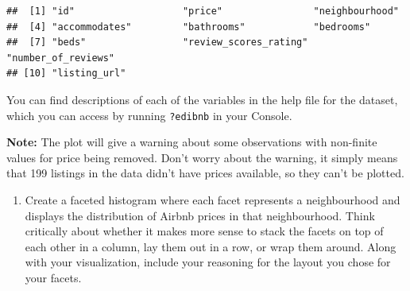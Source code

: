 \documentclass[
]{article}
\providecommand{\tightlist}{%
  \setlength{\itemsep}{0pt}\setlength{\parskip}{0pt}}
\begin{document}
\begin{verbatim}
##  [1] "id"                   "price"                "neighbourhood"       
##  [4] "accommodates"         "bathrooms"            "bedrooms"            
##  [7] "beds"                 "review_scores_rating" "number_of_reviews"   
## [10] "listing_url"
\end{verbatim}

You can find descriptions of each of the variables in the help file for
the dataset, which you can access by running \texttt{?edibnb} in your
Console.

\begin{marginnote}
\textbf{Note:} The plot will give a warning about some observations with
non-finite values for price being removed. Don't worry about the
warning, it simply means that 199 listings in the data didn't have
prices available, so they can't be plotted.
\end{marginnote}

\begin{enumerate}
\def\labelenumi{\arabic{enumi}.}
\tightlist
\item
  Create a faceted histogram where each facet represents a neighbourhood
  and displays the distribution of Airbnb prices in that neighbourhood.
  Think critically about whether it makes more sense to stack the facets
  on top of each other in a column, lay them out in a row, or wrap them
  around. Along with your visualization, include your reasoning for the
  layout you chose for your facets.
\end{enumerate}
\end{document}
